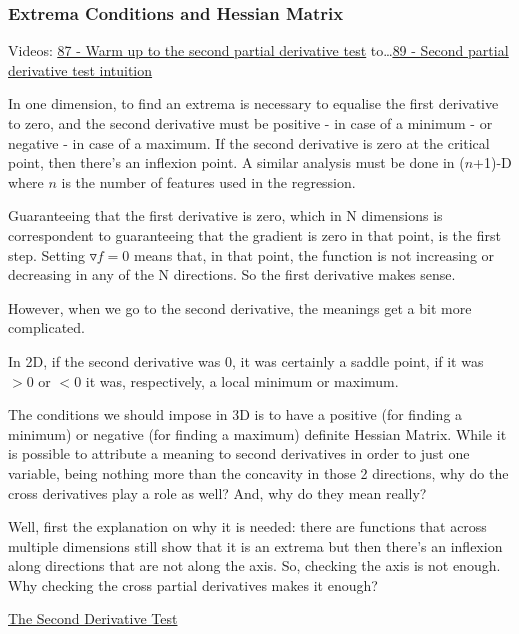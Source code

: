 \subsubsection{Extrema Conditions and Hessian Matrix}

Videos: \href{https://www.youtube.com/watch?v=nRJM4mY-Pq0&list=PLSQl0a2vh4HC5feHa6Rc5c0wbRTx56nF7&index=87}{\ul{87 - Warm up to the second partial derivative test}} to\dots \href{https://www.youtube.com/watch?v=sJo7D74PAak&list=PLSQl0a2vh4HC5feHa6Rc5c0wbRTx56nF7&index=89}{\ul{89 - Second partial derivative test intuition}}



In one dimension, to find an extrema is necessary to equalise the first derivative to zero, and the second derivative must be positive - in case of a minimum - or negative - in case of a maximum. If the second derivative is zero at the critical point, then there's an inflexion point. A similar analysis must be done in ($n$+1)-D where $n$ is the number of features used in the regression.

Guaranteeing that the first derivative is zero, which in N dimensions is correspondent to guaranteeing that the gradient is zero in that point, is the first step. Setting $\triangledown f = 0$ means that, in that point, the function is not increasing or decreasing in any of the N directions. So the first derivative makes sense.

However, when we go to the second derivative, the meanings get a bit more complicated.

In 2D, if the second derivative was 0, it was certainly a saddle point, if it was $> 0$ or $< 0$ it was, respectively, a local minimum or maximum.

The conditions we should impose in 3D is to have a positive (for finding a minimum) or negative (for finding a maximum) definite Hessian Matrix. While it is possible to attribute a meaning to second derivatives in order to just one variable, being nothing more than the concavity in those 2 directions, why do the cross derivatives play a role as well? And, why do they mean really?

Well, first the explanation on why it is needed: there are functions that across multiple dimensions still show that it is an extrema but then there's an inflexion along directions that are not along the axis. So, checking the axis is not enough. Why checking the cross partial derivatives makes it enough?

\ul{The Second Derivative Test}

